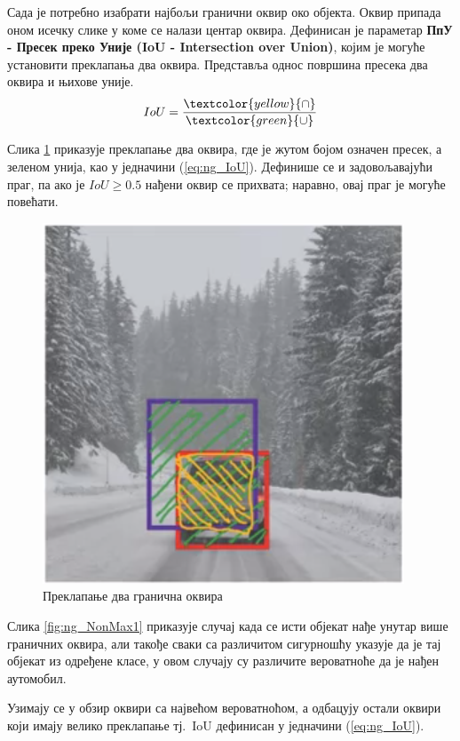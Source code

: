 \documentclass[12pt, а4paper]{article}
\begin{document}
Сада је потребно изабрати најбољи гранични оквир око објекта.
Оквир припада оном исечку слике у коме се налази центар оквира.
Дефинисан је параметар
\textbf{ПпУ - Пресек преко Уније (IoU - Intersection over Union)},
којим је могуће установити преклапања два оквира.
Представља однос површина пресека два оквира и њихове уније.
\begin{equation}
IoU = \frac{\textcolor{yellow}{\cap}}{\textcolor{green}{\cup}}
\label{eq:ng_IoU}
\end{equation}

Слика \ref{fig:ng_IoU} приказује преклапање два оквира, где је
жутом бојом означен пресек, а зеленом унија, као
у једначини (\ref{eq:ng_IoU}).
Дефинише се и задовољавајући праг, па ако је $IoU \geq 0.5$ нађени
оквир се прихвата; наравно, овај праг је могуће повећати.
\begin{figure}[H]
  \centering
      \includegraphics[scale=0.6]{slike/ngIoU.png}
  \caption{Преклапање два гранична оквира}
  \label{fig:ng_IoU}
\end{figure}

Слика \ref{fig:ng_NonMax1} приказује случај када се исти објекат
нађе унутар више граничних оквира, али такође сваки са различитом
сигурношћу указује да је тај објекат из одређене класе, у овом
случају су различите вероватноће да је нађен аутомобил.

Узимају се у обзир оквири са највећом вероватноћом, а одбацују остали
оквири који имају велико преклапање тј.\ IoU дефинисан у
једначини (\ref{eq:ng_IoU}).
\end{document}
